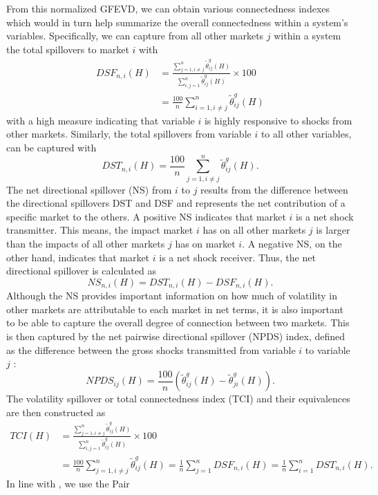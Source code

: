 \documentclass[preprint, 3p,
authoryear]{elsarticle} %
\begin{document}
From this normalized GFEVD, we can obtain various connectedness indexes
which would in turn help summarize the overall connectedness within a
system's variables. Specifically, we can capture from all other markets
\(j\) within a system the total spillovers to market \(i\) with
\begin{align}
DSF_{n,i}(H) 
&= \frac{\displaystyle\sum_{j=1,i\neq j}^n\tilde{\theta}_{ij}^g(H)}{\displaystyle\sum_{i,j=1}^n\tilde{\theta}_{ij}^g(H)} \times 100 \\
&= \frac{100}{n}\sum_{i=1, i\neq j}^n\tilde{\theta}_{ij}^g(H)
\end{align} with a high measure indicating that variable \(i\) is highly
responsive to shocks from other markets. Similarly, the total spillovers
from variable \(i\) to all other variables, can be captured with
\begin{equation}
DST_{n,i}(H) = \frac{100}{n}\sum_{j=1,i \neq j}^n \tilde{\theta}_{ij}^g(H).
\end{equation} The net directional spillover (NS) from \(i\) to \(j\)
results from the difference between the directional spillovers DST and
DSF and represents the net contribution of a specific market to the
others. A positive NS indicates that market \(i\) is a net shock
transmitter. This means, the impact market \(i\) has on all other
markets \(j\) is larger than the impacts of all other markets \(j\) has
on market \(i\). A negative NS, on the other hand, indicates that market
\(i\) is a net shock receiver. Thus, the net directional spillover is
calculated as \begin{equation}
NS_{n,i}(H) = DST_{n,i}(H) - DSF_{n,i}(H).
\end{equation} Although the NS provides important information on how
much of volatility in other markets are attributable to each market in
net terms, it is also important to be able to capture the overall degree
of connection between two markets. This is then captured by the net
pairwise directional spillover (NPDS) index, defined as the difference
between the gross shocks transmitted from variable \(i\) to variable
\(j\) \citet{diebold_better_2012}: \begin{equation}
NPDS_{ij}(H)=\frac{100}{n}(\tilde{\theta}_{ij}^g(H) - \tilde{\theta}_{ji}^g(H)).
\end{equation} The volatility spillover or total connectedness index
(TCI) and their equivalences are then constructed as \begin{align}
TCI(H) 
&= \frac{\displaystyle\sum_{j=1, i\neq j}^n\tilde{\theta}_{ij}^g(H)}{\displaystyle\sum_{i,j=1}^n\tilde{\theta}_{ij}^g(H)} \times 100 \\
&= \frac{100}{n}\sum_{j=1, i \neq j}^n\tilde{\theta}_{ij}^g(H) = \frac{1}{n}\sum_{j=1}^nDSF_{n,i}(H) = \frac{1}{n}\sum_{i=1}^nDST_{n,i}(H). 
\end{align} In line with \citet{gabauer_dynamic_2021}, we use the Pair
\end{document}
